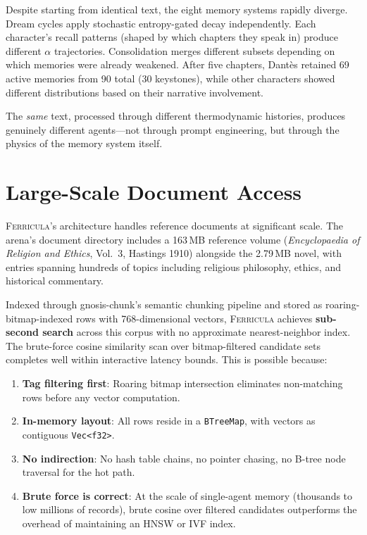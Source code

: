 \documentclass[twocolumn,10pt]{article}
\begin{document}
Despite starting from identical text, the eight memory systems
rapidly diverge.  Dream cycles apply stochastic entropy-gated decay
independently.  Each character's recall patterns (shaped by which
chapters they speak in) produce different $\alpha$ trajectories.
Consolidation merges different subsets depending on which memories
were already weakened.  After five chapters, Dant\`es retained 69
active memories from 90 total (30 keystones), while other characters
showed different distributions based on their narrative involvement.

The \textit{same} text, processed through different thermodynamic
histories, produces genuinely different agents---not through
prompt engineering, but through the physics of the memory system itself.

\section{Large-Scale Document Access}

\textsc{Ferricula}'s architecture handles reference documents at
significant scale.  The arena's document directory includes a 163\,MB
reference volume (\textit{Encyclopaedia of Religion and Ethics},
Vol.~3, Hastings 1910) alongside the 2.79\,MB novel, with entries
spanning hundreds of topics including religious philosophy, ethics,
and historical commentary.

Indexed through gnosis-chunk's semantic chunking pipeline and stored
as roaring-bitmap-indexed rows with 768-dimensional vectors,
\textsc{Ferricula} achieves \textbf{sub-second search} across this
corpus with no approximate nearest-neighbor index.  The brute-force
cosine similarity scan over bitmap-filtered candidate sets completes
well within interactive latency bounds.  This is possible because:

\begin{enumerate}[leftmargin=*,itemsep=2pt]
\item \textbf{Tag filtering first}: Roaring bitmap intersection
  eliminates non-matching rows before any vector computation.
\item \textbf{In-memory layout}: All rows reside in a
  \texttt{BTreeMap}, with vectors as contiguous \texttt{Vec<f32>}.
\item \textbf{No indirection}: No hash table chains, no pointer
  chasing, no B-tree node traversal for the hot path.
\item \textbf{Brute force is correct}: At the scale of single-agent
  memory (thousands to low millions of records), brute cosine over
  filtered candidates outperforms the overhead of maintaining an
  HNSW or IVF index.
\end{enumerate}
\end{document}
